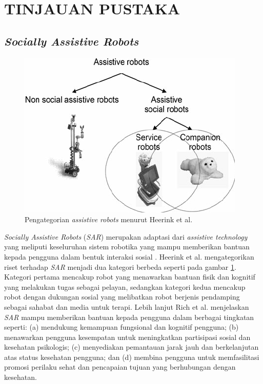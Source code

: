 \section{TINJAUAN PUSTAKA}

\subsection{\emph{Socially Assistive Robots}}

\begin{figure} [ht] \centering
	\includegraphics[scale=0.45]{gambar/robots-category.png}
	\caption{Pengategorian \emph{assistive robots} menurut Heerink et al.}
	\label{fig:RobotsCategory}
\end{figure}

\emph{Socially Assistive Robots} (\emph{SAR}) merupakan adaptasi dari \emph{assistive technology} yang meliputi keseluruhan sistem robotika yang mampu memberikan bantuan kepada pengguna dalam bentuk interaksi sosial \citep{Seifer2005}.
Heerink et al. \citep{Heerink2010} mengategorikan riset terhadap \emph{SAR} menjadi dua kategori berbeda seperti pada gambar \ref{fig:RobotsCategory}.
Kategori pertama mencakup robot yang menawarkan bantuan fisik dan kognitif yang melakukan tugas sebagai pelayan, sedangkan kategori kedua mencakup robot dengan dukungan sosial yang melibatkan robot berjenis pendamping sebagai sahabat dan media untuk terapi.
Lebih lanjut Rich et al. \citep{Rich2009} menjelaskan \emph{SAR} mampu memberikan bantuan kepada pengguna dalam berbagai tingkatan seperti:
(a) mendukung kemampuan fungsional dan kognitif pengguna;
(b) menawarkan pengguna kesempatan untuk meningkatkan partisipasi sosial dan kesehatan psikologis;
(c) menyediakan pemantauan jarak jauh dan berkelanjutan atas status kesehatan pengguna;
dan (d) membina pengguna untuk memfasilitasi promosi perilaku sehat dan pencapaian tujuan yang berhubungan dengan kesehatan.

